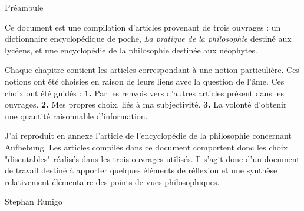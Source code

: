 
\thispagestyle{empty}

\begin{center}
\Large
Préambule
\normalsize
\end{center}
\vspace{3cm}

Ce document est une compilation d'articles provenant de trois ouvrages : un dictionnaire encyclopédique de poche, {\it La pratique de la philosophie} destiné aux lycéens, et une encyclopédie de la philosophie destinée aux néophytes. 

\vspace{1.3cm}

Chaque chapitre contient les articles correspondant à une notion particulière. Ces notions ont été choisies en raison de leurs liens avec la question de l'âme. Ces choix ont été guidés : {\bf 1.} Par les renvois vers d'autres articles présent dans les ouvrages. {\bf 2.} Mes propres choix, liés à ma subjectivité. {\bf 3.} La volonté d'obtenir une quantité raisonnable d'information.

\vspace{1.3cm}

J'ai reproduit en annexe l'article de l'encyclopédie de la philosophie concernant Aufhebung.
Les articles compilés dans ce document comportent donc les choix "discutables" réalisés dans les trois ouvrages utilisés. Il s'agit donc d'un document de travail destiné à apporter quelques éléments de réflexion et une synthèse relativement élémentaire des points de vues philosophiques.

\vspace{1.3cm}


\vspace{2.3cm}

\hfill Stephan Runigo

